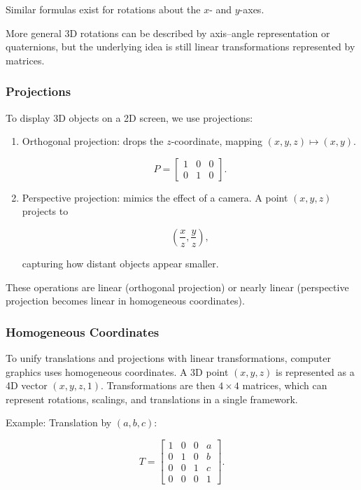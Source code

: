 \documentclass[
  12pt,
  a4paper,
]{article}
\begin{document}
Similar formulas exist for rotations about the \(x\)- and \(y\)-axes.

More general 3D rotations can be described by axis--angle representation
or quaternions, but the underlying idea is still linear transformations
represented by matrices.

\subsubsection{Projections}\label{projections-2}

To display 3D objects on a 2D screen, we use projections:

\begin{enumerate}
\def\labelenumi{\arabic{enumi}.}
\item
  Orthogonal projection: drops the \(z\)-coordinate, mapping
  \((x,y,z) \mapsto (x,y)\).

  \[P = \begin{bmatrix}
  1 & 0 & 0 \\
  0 & 1 & 0
  \end{bmatrix}.\]
\item
  Perspective projection: mimics the effect of a camera. A point
  \((x,y,z)\) projects to

  \[\left(\frac{x}{z}, \frac{y}{z}\right),\]

  capturing how distant objects appear smaller.
\end{enumerate}

These operations are linear (orthogonal projection) or nearly linear
(perspective projection becomes linear in homogeneous coordinates).

\subsubsection{Homogeneous Coordinates}\label{homogeneous-coordinates}

To unify translations and projections with linear transformations,
computer graphics uses homogeneous coordinates. A 3D point \((x,y,z)\)
is represented as a 4D vector \((x,y,z,1)\). Transformations are then
\(4 \times 4\) matrices, which can represent rotations, scalings, and
translations in a single framework.

Example: Translation by \((a,b,c)\):

\[T = \begin{bmatrix}
1 & 0 & 0 & a \\
0 & 1 & 0 & b \\
0 & 0 & 1 & c \\
0 & 0 & 0 & 1
\end{bmatrix}.\]
\end{document}
